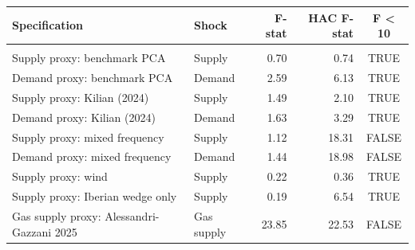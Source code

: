 \begin{tabular*}{\linewidth}{@{\extracolsep{\fill}}llrrc}
\toprule
Specification & Shock & F-stat & HAC F-stat & F < 10 \\ 
\midrule\addlinespace[2.5pt]
\multicolumn{5}{l}{Spain} \\[2.5pt] 
\midrule\addlinespace[2.5pt]
Supply proxy: benchmark PCA & Supply & 0.70 & 0.74 & TRUE \\ 
Demand proxy: benchmark PCA & Demand & 2.59 & 6.13 & TRUE \\ 
Supply proxy: Kilian (2024) & Supply & 1.49 & 2.10 & TRUE \\ 
Demand proxy: Kilian (2024) & Demand & 1.63 & 3.29 & TRUE \\ 
Supply proxy: mixed frequency & Supply & 1.12 & 18.31 & FALSE \\ 
Demand proxy: mixed frequency & Demand & 1.44 & 18.98 & FALSE \\ 
Supply proxy: wind & Supply & 0.22 & 0.36 & TRUE \\ 
Supply proxy: Iberian wedge only & Supply & 0.19 & 6.54 & TRUE \\ 
Gas supply proxy: Alessandri-Gazzani 2025 & Gas supply & 23.85 & 22.53 & FALSE \\ 
\bottomrule
\end{tabular*}
